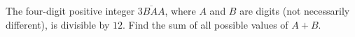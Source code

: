 The four-digit positive integer $\overline{3BAA}$, where $A$ and $B$ are digits (not necessarily different), is divisible by $12$. Find the sum of all possible values of $A+B$.
